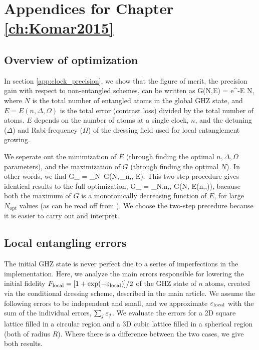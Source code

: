 \chapter{Appendices for Chapter \ref{ch:Komar2015}}
\label{app:Komar2015}

\section{Overview of optimization}
In section \ref{app:clock_precision}, we show that the figure of merit, the
precision gain with respect to non-entangled schemes, can be written as
\bel
\label{eq:G_first}
	G(N,E) = e^{-E N},
\eel
where $N$ is the total number of entangled atoms in the global GHZ state, and
$E = E(n,\Delta,\Omega)$ is the total error (contrast loss) divided by the total
number of atoms. $E$ depends on the number of atoms at a single clock, $n$, and the
detuning ($\Delta$) and Rabi-frequency ($\Omega$) of the dressing field used for
local entanglement growing.

We seperate out the
minimization of $E$ (through finding the optimal $n, \Delta, \Omega$
parameters), and the maximization of $G$ (through finding the optimal $N$). In
other words, we find
\bel
	G_ = \max_N \,G\left(N,\,\min_{n,\Delta,\Omega} E\right).
\eel
This two-step procedure gives identical results to the full optimization,
\bel
	G_ = \max_{N,n,\Delta,\Omega} G\Big(N, E(n,\Delta,\Omega)\Big),
\eel
bacause both the maximum of $G$ is a
monotonically decreasing function of $E$, for large $N_\mathrm{opt}$ values (as
can be read off from ).
We choose the two-step precedure because it is easier to carry out and
interpret.


\section{Local entangling errors}
\label{app:local_entanging_errors}
The initial GHZ state is never perfect due to a series of imperfections in the
implementation. Here, we analyze the main errors responsible for lowering the
initial fidelity $F_\mathrm{local} = [1+\exp(-\varepsilon_\mathrm{local})]/2$ of the GHZ
state of $n$ atoms, created via the conditional dressing scheme,  described in
the main article. We assume the following errors to be independent and small,
and we approximate $\varepsilon_\mathrm{local}$ with the sum
of the individual errors, $\sum_j \varepsilon_j$. We evaluate the errors for a 2D
square lattice filled in a circular region and a 3D cubic lattice filled in a
spherical region (both of radius $R$). Where there is
a difference between the two cases, we give both results.
 

